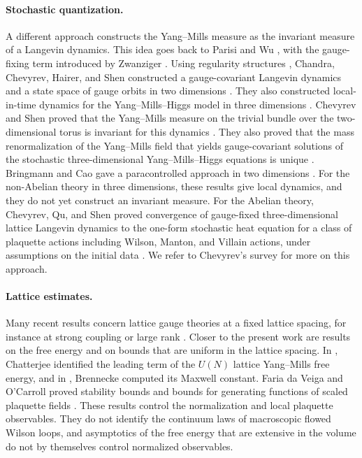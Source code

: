 \paragraph{Stochastic quantization.}
A different approach constructs the Yang--Mills measure as the invariant measure of a Langevin dynamics. This idea goes back to Parisi and Wu \cite{ParisiWu1981}, with the gauge-fixing term introduced by Zwanziger \cite{Zwanziger1981}. Using regularity structures \cite{Hairer2014}, Chandra, Chevyrev, Hairer, and Shen constructed a gauge-covariant Langevin dynamics and a state space of gauge orbits in two dimensions \cite{ChandraChevyrevHairerShen2022}. They also constructed local-in-time dynamics for the Yang--Mills--Higgs model in three dimensions \cite{ChandraChevyrevHairerShen2024}. Chevyrev and Shen proved that the Yang--Mills measure on the trivial bundle over the two-dimensional torus is invariant for this dynamics \cite{ChevyrevShen2026Invariant}. They also proved that the mass renormalization of the Yang--Mills field that yields gauge-covariant solutions of the stochastic three-dimensional Yang--Mills--Higgs equations is unique \cite{ChevyrevShen2026Uniqueness}. Bringmann and Cao gave a paracontrolled approach in two dimensions \cite{BringmannCao2026}. For the non-Abelian theory in three dimensions, these results give local dynamics, and they do not yet construct an invariant measure. For the Abelian theory, Chevyrev, Qu, and Shen proved convergence of gauge-fixed three-dimensional lattice Langevin dynamics to the one-form stochastic heat equation for a class of plaquette actions including Wilson, Manton, and Villain actions, under assumptions on the initial data \cite{ChevyrevQuShen2026}. We refer to Chevyrev's survey \cite{Chevyrev2022Survey} for more on this approach.

\paragraph{Lattice estimates.}
Many recent results concern lattice gauge theories at a fixed lattice spacing, for instance at strong coupling or large rank \cite{Chatterjee2019a,ChatterjeeJafarov2016,BasuGanguly2018,Shen2023,CaoNissim2025a,AdhikariCao2025}. Closer to the present work are results on the free energy and on bounds that are uniform in the lattice spacing. In \cite{Chatterjee2016}, Chatterjee identified the leading term of the $U(N)$ lattice Yang--Mills free energy, and in \cite{Brennecke2026}, Brennecke computed its Maxwell constant. Faria da Veiga and O'Carroll proved stability bounds and bounds for generating functions of scaled plaquette fields \cite{FariaVeigaOCarroll2019,FariaVeigaOCarroll2025}. These results control the normalization and local plaquette observables. They do not identify the continuum laws of macroscopic flowed Wilson loops, and asymptotics of the free energy that are extensive in the volume do not by themselves control normalized observables.

